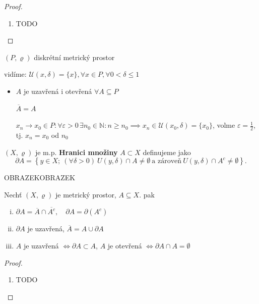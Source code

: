 \begin{proof}
  \begin{enumerate}[{ad} i.]
    \item TODO
  \end{enumerate}
\end{proof}

\begin{priklad}
  $(P, \varrho)$ diskrétní metrický prostor

  vidíme: $\mathscr U(x, \delta) = \{x\}, \forall x \in P, \forall 0 < \delta \leq 1$
  \begin{itemize}
    \item[$\implies$] $A$ je uzavřená i otevřená $\forall A \subseteq P$

    $\overline{A} =A$

    $x_n \to x_0 \in P: \forall \varepsilon > 0\, \exists n_0 \in \mathbb N: n\geq n_0 \implies x_n \in \mathscr U(x_0, \delta) = \{x_0\}$, volme $\varepsilon = \frac{1}{2}$, tj. $x_n = x_0$ od $n_0$
  \end{itemize}
\end{priklad}

\begin{definice}
$(X, \varrho)$ je m.p. \textbf{Hranici množiny} $A \subset X$ definujeme jako
\[
\partial A = \left\{y \in X; \ (\forall \delta > 0) \ U(y, \delta) \cap A \neq \emptyset \ \text{a zároveň} \ U(y, \delta) \cap A^c \neq \emptyset \right\}.
\]
\end{definice}
OBRAZEKOBRAZEK

\begin{veta}
  Nechť $(X, \varrho)$ je metrický prostor, $A\subseteq X$. pak
  \begin{enumerate}[i.]
    \item $\partial A = \overline{A} \cap \overline{A^c}, \quad \partial A = \partial (A^c)$
    \item $\partial A$ je uzavřená, $\overline{A} = A \cup \partial A$
    \item $A$ je uzavřená $\iff \partial A \subset A$, $A$ je otevřená $\iff \partial A \cap A = \emptyset$
  \end{enumerate}
\end{veta}

\begin{proof}
  \begin{enumerate}[{ad} i]
    \item TODO
  \end{enumerate}
\end{proof}

